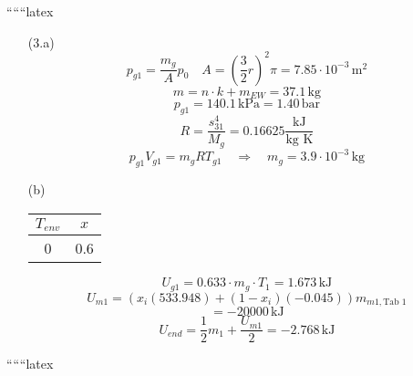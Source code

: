 
``````latex


\begin{enumerate}
    \item[(3.a)] 
    \[
    p_{g1} = \frac{m_g}{A} p_0 \quad A = \left(\frac{3}{2} r\right)^2 \pi = 7.85 \cdot 10^{-3} \, \text{m}^2
    \]
    \[
    m = n \cdot k + m_{EW} = 37.1 \, \text{kg}
    \]
    \[
    p_{g1} = 140.1 \, \text{kPa} = 1.40 \, \text{bar}
    \]
    \[
    R = \frac{s_{31}^4}{M_g} = 0.16625 \frac{\text{kJ}}{\text{kg K}}
    \]
    \[
    p_{g1} V_{g1} = m_g R T_{g1} \quad \Rightarrow \quad m_g = 3.9 \cdot 10^{-3} \, \text{kg}
    \]

    \item[(b)]
    \begin{tabular}{|c|c|}
        \hline
        $T_{env}$ & $x$ \\
        \hline
        0 & 0.6 \\
        \hline
    \end{tabular}
    \[
    U_{g1} = 0.633 \cdot m_g \cdot T_1 = 1.673 \, \text{kJ}
    \]
    \[
    U_{m1} = (x_i (533.948) + (1 - x_i) (-0.045)) m_{m1, \text{Tab 1}}
    \]
    \[
    = -20000 \, \text{kJ}
    \]
    \[
    U_{end} = \frac{1}{2} m_1 + \frac{U_{m1}}{2} = -2.768 \, \text{kJ}
    \]
\end{enumerate}

``````latex

